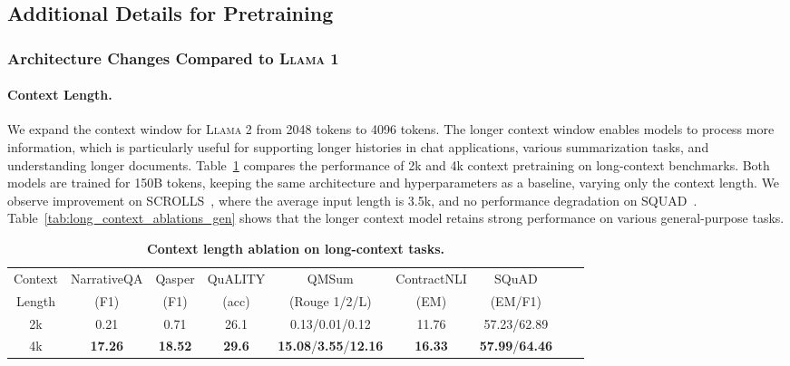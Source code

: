 \documentclass{article}
\newcommand{\anise}{\textsc{Llama 1}\xspace}
\newcommand{\cinnamon}{\textsc{Llama 2}\xspace}
\begin{document}
\subsection{Additional Details for Pretraining}
\label{sec:appendix_pretrain_details}

\subsubsection{Architecture Changes Compared to \anise}
\label{sec:appendix_pretrain_details_archi_changes}

\paragraph{Context Length.} 
\label{sec:app_ctx_len}

We expand the context window for \cinnamon from 2048 tokens to 4096 tokens. 
The longer context window enables models to process more information, which is particularly useful for supporting longer histories in chat applications, various summarization tasks, and understanding longer documents.
Table~\ref{tab:long_context_ablations} compares the performance of 2k and 4k context pretraining on long-context benchmarks. Both models are trained for 150B tokens, keeping the same architecture and hyperparameters as a baseline, varying only the context length. We observe improvement on SCROLLS~\citep{shaham-etal-2022-scrolls}, where the average input length is 3.5k, and no performance degradation on SQUAD~\citep{rajpurkar2018know}. Table~\ref{tab:long_context_ablations_gen} shows that the longer context model retains strong performance on various general-purpose tasks.

\begin{table}[b!]
    \small
    \centering
    \setlength{\tabcolsep}{3pt} 
    \begin{tabular}{ccccccccc}
    \toprule
    Context & NarrativeQA & Qasper & QuALITY & QMSum & ContractNLI  & SQuAD \\
    Length & (F1) & (F1) & (acc) & (Rouge 1/2/L)  & (EM)  & (EM/F1) \\
    \midrule
    \midrule
       2k & 0.21 & 0.71 & 26.1 & 0.13/0.01/0.12 & 11.76  & 57.23/62.89  \\
       4k & \textbf{17.26} & \textbf{18.52} & \textbf{29.6} & \textbf{15.08}/\textbf{3.55}/\textbf{12.16} & \textbf{16.33}  & \textbf{57.99}/\textbf{64.46} \\
    \bottomrule
    \end{tabular}
    \caption{
    \textbf{Context length ablation on long-context tasks.}
    \label{tab:long_context_ablations}
    }
  \end{table}
\end{document}
